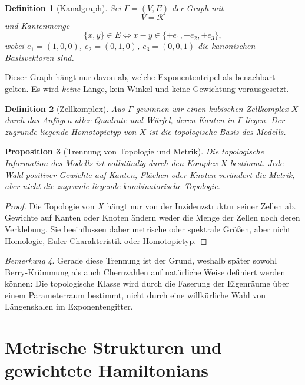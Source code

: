 \documentclass[11pt,a4paper]{article}
\newtheorem{definition}{Definition}[section]
\newtheorem{proposition}[definition]{Proposition}
\theoremstyle{remark}
\newtheorem{bemerkung}[definition]{Bemerkung}
\newcommand{\K}{\mathcal{K}}
\begin{document}
	\begin{definition}[Kanalgraph]
		Sei $\Gamma=(V,E)$ der Graph mit
		\begin{equation}
			V=\K
		\end{equation}
		und Kantenmenge
		\begin{equation}
			\{x,y\}\in E \iff x-y\in\{\pm e_1,\pm e_2,\pm e_3\},
		\end{equation}
		wobei $e_1=(1,0,0)$, $e_2=(0,1,0)$, $e_3=(0,0,1)$ die kanonischen Basisvektoren sind.
	\end{definition}
	
	Dieser Graph hängt nur davon ab, welche Exponententripel als benachbart gelten. Es wird \emph{keine} Länge, kein Winkel und keine Gewichtung vorausgesetzt.
	
	\begin{definition}[Zellkomplex]
		Aus $\Gamma$ gewinnen wir einen kubischen Zellkomplex $X$ durch das Anfügen aller Quadrate und Würfel, deren Kanten in $\Gamma$ liegen. Der zugrunde liegende Homotopietyp von $X$ ist die topologische Basis des Modells.
	\end{definition}
	
	\begin{proposition}[Trennung von Topologie und Metrik]
		Die topologische Information des Modells ist vollständig durch den Komplex $X$ bestimmt. Jede Wahl positiver Gewichte auf Kanten, Flächen oder Knoten verändert die Metrik, aber nicht die zugrunde liegende kombinatorische Topologie.
	\end{proposition}
	
	\begin{proof}
		Die Topologie von $X$ hängt nur von der Inzidenzstruktur seiner Zellen ab. Gewichte auf Kanten oder Knoten ändern weder die Menge der Zellen noch deren Verklebung. Sie beeinflussen daher metrische oder spektrale Größen, aber nicht Homologie, Euler-Charakteristik oder Homotopietyp.
	\end{proof}
	
	\begin{bemerkung}
		Gerade diese Trennung ist der Grund, weshalb später sowohl Berry-Krümmung als auch Chernzahlen auf natürliche Weise definiert werden können: Die topologische Klasse wird durch die Faserung der Eigenräume über einem Parameterraum bestimmt, nicht durch eine willkürliche Wahl von Längenskalen im Exponentengitter.
	\end{bemerkung}
	
	\section{Metrische Strukturen und gewichtete Hamiltonians}
	
\end{document}
